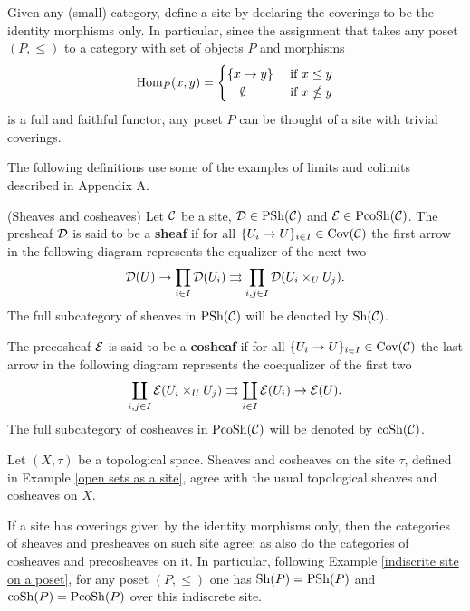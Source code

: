 \documentclass[thesis.tex]{subfiles}
\begin{document}
\begin{example}\label{indiscrite site on a poset}
Given any (small) category, define a site by declaring the coverings to be the identity morphisms only. In particular, since the assignment that takes any poset $(P,\leq)$ to a category with set of objects $P$ and morphisms $$\mathrm{Hom}_P(x,y)=\begin{cases}\{x\to y\}& \text{ if } x\leq y\\ \ \ \ \emptyset & \text{ if } x\nleq y\end{cases}$$ is a full and faithful functor, any poset $P$ can be thought of a site with trivial coverings.
\end{example}

The following definitions use some of the examples of limits and colimits described in Appendix A.

\begin{definition}(Sheaves and cosheaves)
Let $\operatorname{\mathcal{C}}$ be a site, $\operatorname{\mathcal{D}}\in\operatorname{PSh}(\operatorname{\mathcal{C}})$ and $\operatorname{\mathcal{E}}\in\operatorname{PcoSh}(\operatorname{\mathcal{C}})$. The presheaf $\operatorname{\mathcal{D}}$ is said to be a \textbf{sheaf} if for all $\{U_i\to U\}_{i\in I}\in\operatorname{Cov}(\operatorname{\mathcal{C}})$ the first arrow in the following diagram represents the equalizer of the next two $$\operatorname{\mathcal{D}}(U)\to\prod_{i\in I}\operatorname{\mathcal{D}}(U_i)\rightrightarrows\prod_{i,j\in I}\operatorname{\mathcal{D}}(U_i\times_U U_j).$$ The full subcategory of sheaves in $\operatorname{PSh}(\operatorname{\mathcal{C}})$ will be denoted by $\operatorname{Sh}(\operatorname{\mathcal{C}})$.\par

The precosheaf $\operatorname{\mathcal{E}}$ is said to be a \textbf{cosheaf} if for all $\{U_i\to U\}_{i\in I}\in\operatorname{Cov}(\operatorname{\mathcal{C}})$ the last arrow in the following diagram represents the coequalizer of the first two $$\coprod_{i,j\in I}\operatorname{\mathcal{E}}(U_i\times_U U_j)\rightrightarrows\coprod_{i\in I}\operatorname{\mathcal{E}}(U_i)\to\operatorname{\mathcal{E}}(U).$$
The full subcategory of cosheaves in $\operatorname{PcoSh}(\operatorname{\mathcal{C}})$ will be denoted by $\operatorname{coSh}(\operatorname{\mathcal{C}})$.
\end{definition}

\begin{example}
Let $(X,\tau)$ be a topological space. Sheaves and cosheaves on the site $\tau$, defined in Example \ref{open sets as a site}, agree with the usual topological sheaves and cosheaves on $X$.
\end{example}

\begin{example}
If a site has coverings given by the identity morphisms only, then the categories of sheaves and presheaves on such site agree; as also do the categories of cosheaves and precosheaves on it. In particular, following Example \ref{indiscrite site on a poset}, for any poset $(P,\leq)$ one has $\operatorname{Sh}(P)=\operatorname{PSh}(P)$ and $\operatorname{coSh}(P)=\operatorname{PcoSh}(P)$ over this indiscrete site.
\end{example}
\end{document}

